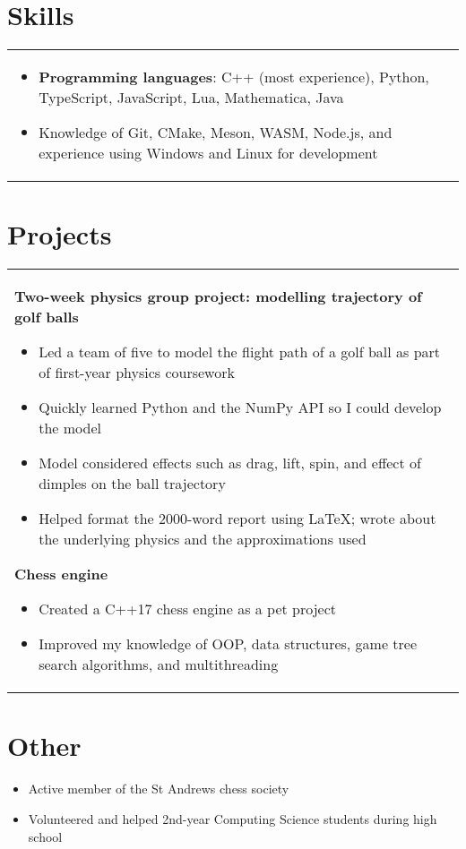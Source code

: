 \documentclass{article}
\begin{document}
	\section*{Skills}
	\begin{tabular}{p{15.6cm}}
		\vspace{-\topsep}
		\begin{itemize}
			\vspace{-\topsep}
			\item \textbf{Programming languages}: C++ (most experience), Python, TypeScript, JavaScript, Lua, Mathematica, Java
			\item Knowledge of Git, CMake, Meson, WASM, Node.js, and experience using Windows and Linux for development
		\end{itemize}
	\end{tabular}
	\vspace{-1ex}
	
	\section*{Projects}
	\begin{tabular}{p{15.6cm}}
		\textbf{Two-week physics group project: modelling trajectory of golf balls}
		\begin{itemize}
			\item Led a team of five to model the flight path of a golf ball as part of first-year physics coursework
			\item Quickly learned Python and the NumPy API so I could develop the model
			\item Model considered effects such as drag, lift, spin, and effect of dimples on the ball trajectory
			\item Helped format the 2000-word report using LaTeX; wrote about the underlying physics and the approximations used
		\end{itemize}
		
		\textbf{Chess engine}
		\begin{itemize}
			\item Created a C++17 chess engine as a pet project
			\item Improved my knowledge of OOP, data structures, game tree search algorithms, and multithreading
		\end{itemize}
	\end{tabular}
	\vspace{-1ex}
	
	\section*{Other}
	\begin{itemize}
		\item Active member of the St Andrews chess society
		\item Volunteered and helped 2nd-year Computing Science students during high school
	\end{itemize}
	
\end{document}
